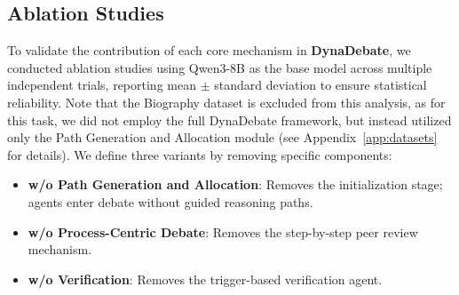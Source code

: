 \subsection{Ablation Studies}
\label{sec:ablation}

To validate the contribution of each core mechanism in \textbf{DynaDebate}, we conducted ablation studies using Qwen3-8B as the base model across multiple independent trials, reporting mean $\pm$ standard deviation to ensure statistical reliability. Note that the Biography dataset is excluded from this analysis, as for this task, we did not employ the full DynaDebate framework, but instead utilized only the Path Generation and Allocation module (see Appendix~\ref{app:datasets} for details). We define three variants by removing specific components:

\begin{itemize}
    \item \textbf{w/o Path Generation and Allocation}: Removes the initialization stage; agents enter debate without guided reasoning paths.
    \item \textbf{w/o Process-Centric Debate}: Removes the step-by-step peer review mechanism.
    \item \textbf{w/o Verification}: Removes the trigger-based verification agent.
\end{itemize}

\begin{table}[t]
\centering
{}
\caption{Ablation study on Qwen3-8B. We report mean $\pm$ std accuracy (\%) across five benchmarks over multiple independent runs.}
\label{tab:ablation}
\vspace{-4pt}
\end{table}


